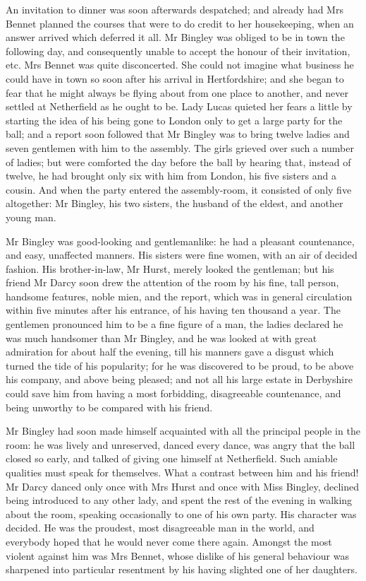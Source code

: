 An invitation to dinner was soon afterwards despatched; and already had Mrs Bennet planned the courses that were to do credit to her housekeeping, when an answer arrived which deferred it all. Mr Bingley was obliged to be in town the following day, and consequently unable to accept the honour of their invitation, etc. Mrs Bennet was quite disconcerted. She could not imagine what business he could have in town so soon after his arrival in Hertfordshire; and she began to fear that he might always be flying about from one place to another, and never settled at Netherfield as he ought to be. Lady Lucas quieted her fears a little by starting the idea of his being gone to London only to get a large party for the ball; and a report soon followed that Mr Bingley was to bring twelve ladies and seven gentlemen with him to the assembly. The girls grieved over such a number of ladies; but were comforted the day before the ball by hearing that, instead of twelve, he had brought only six with him from London, his five sisters and a cousin. And when the party entered the assembly-room, it consisted of only five altogether: Mr Bingley, his two sisters, the husband of the eldest, and another young man.

Mr Bingley was good-looking and gentlemanlike: he had a pleasant countenance, and easy, unaffected manners. His sisters were fine women, with an air of decided fashion. His brother-in-law, Mr Hurst, merely looked the gentleman; but his friend Mr Darcy soon drew the attention of the room by his fine, tall person, handsome features, noble mien, and the report, which was in general circulation within five minutes after his entrance, of his having ten thousand a year. The gentlemen pronounced him to be a fine figure of a man, the ladies declared he was much handsomer than Mr Bingley, and he was looked at with great admiration for about half the evening, till his manners gave a disgust which turned the tide of his popularity; for he was discovered to be proud, to be above his company, and above being pleased; and not all his large estate in Derbyshire could save him from having a most forbidding, disagreeable countenance, and being unworthy to be compared with his friend.

Mr Bingley had soon made himself acquainted with all the principal people in the room: he was lively and unreserved, danced every dance, was angry that the ball closed so early, and talked of giving one himself at Netherfield. Such amiable qualities must speak for themselves. What a contrast between him and his friend! Mr Darcy danced only once with Mrs Hurst and once with Miss Bingley, declined being introduced to any other lady, and spent the rest of the evening in walking about the room, speaking occasionally to one of his own party. His character was decided. He was the proudest, most disagreeable man in the world, and everybody hoped that he would never come there again. Amongst the most violent against him was Mrs Bennet, whose dislike of his general behaviour was sharpened into particular resentment by his having slighted one of her daughters.



